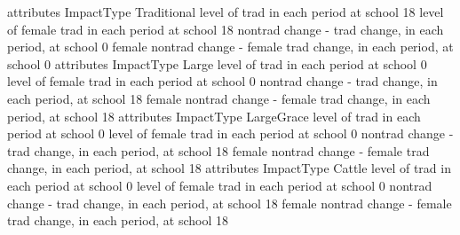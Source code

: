 \begin{Schunk}
\begin{Soutput}
                                                                       attributes
ImpactType                                                              Traditional
  level of trad in each period at school                                         18
  level of female trad in each period at school                                  18
  nontrad change - trad change, in each period, at school                         0
  female nontrad change - female trad change, in each period, at school           0
                                                                       attributes
ImpactType                                                              Large
  level of trad in each period at school                                    0
  level of female trad in each period at school                             0
  nontrad change - trad change, in each period, at school                  18
  female nontrad change - female trad change, in each period, at school    18
                                                                       attributes
ImpactType                                                              LargeGrace
  level of trad in each period at school                                         0
  level of female trad in each period at school                                  0
  nontrad change - trad change, in each period, at school                       18
  female nontrad change - female trad change, in each period, at school         18
                                                                       attributes
ImpactType                                                              Cattle
  level of trad in each period at school                                     0
  level of female trad in each period at school                              0
  nontrad change - trad change, in each period, at school                   18
  female nontrad change - female trad change, in each period, at school     18
\end{Soutput}
\end{Schunk}
